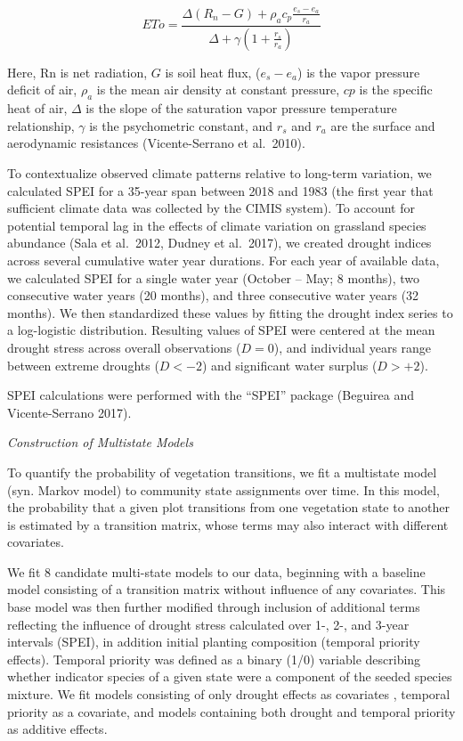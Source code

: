 \documentclass[twoside,12pt,final]{ucthesis-CA2012}
\begin{document}
\begin{ucmainmatter}
\[
ETo = \frac{\Delta(R_n - G) + \rho_a c_p \frac{e_s - e_a}{r_a}}{\Delta + \gamma(1 + \frac{r_s}{r_a})}
\]

Here, Rn is net radiation, \(G\) is soil heat flux, (\(e_s - e_a\)) is the vapor pressure deficit of air, \(\rho_a\) is the mean air density at constant pressure, \(cp\) is the specific heat of air, \(\Delta\) is the slope of the saturation vapor pressure temperature relationship, \(\gamma\) is the psychometric constant, and \(r_s\) and \(r_a\) are the surface and aerodynamic resistances (Vicente-Serrano et al.~2010).

To contextualize observed climate patterns relative to long-term variation, we calculated SPEI for a 35-year span between 2018 and 1983 (the first year that sufficient climate data was collected by the CIMIS system).
To account for potential temporal lag in the effects of climate variation on grassland species abundance (Sala et al.~2012, Dudney et al.~2017), we created drought indices across several cumulative water year durations.
For each year of available data, we calculated SPEI for a single water year (October -- May; 8 months), two consecutive water years (20 months), and three consecutive water years (32 months).
We then standardized these values by fitting the drought index series to a log-logistic distribution.
Resulting values of SPEI were centered at the mean drought stress across overall observations (\(D = 0\)), and individual years range between extreme droughts (\(D < -2\)) and significant water surplus (\(D > +2\)).

SPEI calculations were performed with the ``SPEI'' package (Beguirea and Vicente-Serrano 2017).

\emph{Construction of Multistate Models}

To quantify the probability of vegetation transitions, we fit a multistate model (syn. Markov model) to community state assignments over time.
In this model, the probability that a given plot transitions from one vegetation state to another is estimated by a transition matrix, whose terms may also interact with different covariates.

We fit 8 candidate multi-state models to our data, beginning with a baseline model consisting of a transition matrix without influence of any covariates.
This base model was then further modified through inclusion of additional terms reflecting the influence of drought stress calculated over 1-, 2-, and 3-year intervals (SPEI), in addition initial planting composition (temporal priority effects).
Temporal priority was defined as a binary (1/0) variable describing whether indicator species of a given state were a component of the seeded species mixture.
We fit models consisting of only drought effects as covariates , temporal priority as a covariate, and models containing both drought and temporal priority as additive effects.


\end{ucmainmatter}
\end{document}
